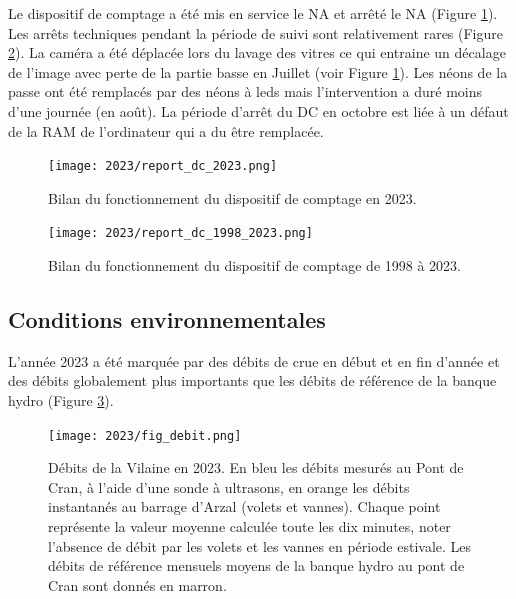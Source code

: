 \documentclass[11pt,twocolumn,titlepage,twoside]{article}\usepackage[]{graphicx}\usepackage[]{color}
\begin{document}
Le dispositif de comptage 
a été mis en service le
NA et arrêté le
NA (Figure \ref{report_dc_2023}).
Les arrêts techniques pendant la période de suivi sont relativement rares
(Figure \ref{report_dc_1998_2023}). 
La caméra a été déplacée lors
du lavage des vitres ce qui entraine un décalage de l'image avec perte de la
partie basse en Juillet (voir Figure \ref{report_dc_2023}). Les néons de la
passe ont été remplacés par des néons à leds mais l'intervention a duré moins
d'une journée (en août). La période d'arrêt du DC en octobre est liée à un défaut de
la RAM de l'ordinateur qui a du être remplacée.

\begin{figure}[htpb]
\centering
\texttt{[image: 2023/report\_dc\_2023.png]} 
\caption{Bilan du fonctionnement du dispositif de comptage en 2023.}
\label{report_dc_2023}
\end{figure}

\begin{figure}[htpb]
\centering
\texttt{[image: 2023/report\_dc\_1998\_2023.png]} 
\caption{Bilan du fonctionnement du dispositif de comptage de 1998 à 2023.}
\label{report_dc_1998_2023}
\end{figure}
























\subsection{Conditions environnementales}

L'année 2023 a été marquée par des débits de crue en début et en
fin d'année et des débits globalement plus importants que les débits de
référence de la banque hydro (Figure \ref{fig_debit}).
\begin{figure}[htpb]
\centering
\texttt{[image: 2023/fig\_debit.png]} 
\caption{Débits de la Vilaine en 2023. En bleu les débits mesurés au Pont
de Cran, à l'aide d'une sonde à ultrasons, en orange les débits instantanés au
barrage d'Arzal (volets et vannes). Chaque point représente la valeur moyenne calculée toute les
dix minutes, noter l'absence de débit par les volets et les vannes en période
estivale. Les débits de référence mensuels moyens de la banque hydro au pont de
Cran sont donnés en marron.}
\label{fig_debit}
\end{figure}
\end{document}
